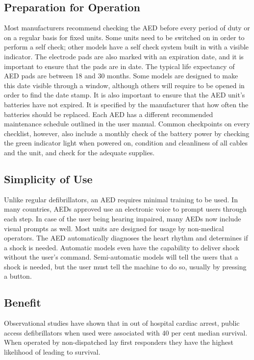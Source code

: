 \documentclass[12pt]{article}
\begin{document}
\begin{normalsize}
\subsection{Preparation for Operation}
Most manufacturers recommend checking the AED before every period of duty or on a regular basis for fixed units. Some units need to be switched on in order to perform a self check; other models have a self check system built in with a visible indicator.
\linebreak
\linebreak
The electrode pads are also marked with an expiration date, and it is important to ensure that the pads are in date. The typical life expectancy of AED pads are between 18 and 30 months. Some models are designed to make this date visible through a window, although others will require to be opened in order to find the date stamp.
\linebreak
\linebreak
It is also important to ensure that the AED unit's batteries have not expired. It is specified by the manufacturer that how often the batteries should be replaced. Each AED has a different recommended maintenance schedule outlined in the user manual. Common checkpoints on every checklist, however, also include a monthly check of the battery power by checking the green indicator light when powered on, condition and cleanliness of all cables and the unit, and check for the adequate supplies.

\subsection{Simplicity of Use}
Unlike regular defibrillators, an AED requires minimal training to be used. In many countries, AEDs approved use an electronic voice to prompt users through each step. In case of the user being hearing impaired, many AEDs now include visual prompts as well. Most units are designed for usage by non-medical operators.
\linebreak
\linebreak
The AED automatically diagnoses the heart rhythm and determines if a shock is needed. Automatic models even have the capability to deliver shock without the user's command. Semi-automatic models will tell the users that a shock is needed, but the user must tell the machine to do so, usually by pressing a button.

\subsection{Benefit}
Observational studies have shown that in out of hospital cardiac arrest, public access defibrillators when used were associated with 40 per cent median survival. When operated by non-dispatched lay first responders they have the highest likelihood of leading to survival.
\clearpage
\centering

\end{normalsize}
\end{document}
